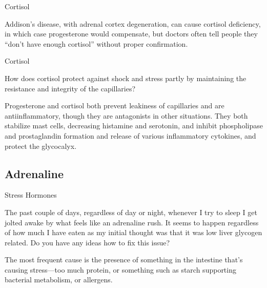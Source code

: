 \documentclass[11pt,oneside,openany,extrafontsizes]{memoir}
\begin{document}
\begin{standalonequote}{Cortisol}

    \begin{answer}
        Addison's disease, with adrenal cortex degeneration, can cause cortisol deficiency, in which case progesterone would compensate, but doctors often tell people they \enquote{don't have enough cortisol} without proper confirmation.
    \end{answer}
\end{standalonequote}

\begin{qaexchange}{Cortisol}

    \begin{question}
        How does cortisol protect against shock and stress partly by maintaining the resistance and integrity of the capillaries?
    \end{question}

    \begin{answer}
      Progesterone and cortisol both prevent leakiness of capillaries and are antiinflammatory, though they are antagonists in other situations. They both stabilize mast cells, decreasing histamine and serotonin, and inhibit phospholipase and prostaglandin formation and release of various inflammatory cytokines, and protect the glycocalyx.
    \end{answer}
\end{qaexchange}

\subsection{Adrenaline}

\begin{qaexchange}{Stress Hormones}

    \begin{question}
        The past couple of days, regardless of day or night, whenever I try to sleep I get jolted awake by what feels like an adrenaline rush. It seems to happen regardless of how much I have eaten as my initial thought was that it was low liver glycogen related. Do you have any ideas how to fix this issue?
    \end{question}

    \begin{answer}
        The most frequent cause is the presence of something in the intestine that's causing stress—too much protein, or something such as starch supporting bacterial metabolism, or allergens.
    \end{answer}
\end{qaexchange}
\end{document}
